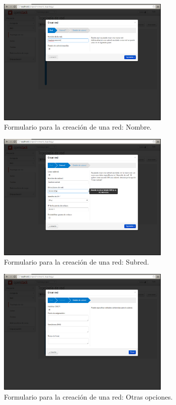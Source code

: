 \documentclass{article}
\begin{document}
\begin{figure}[h]
  \centering
    \includegraphics[width=0.75\textwidth]{img/m_018.png}
  \caption{Formulario para la creación de una red: Nombre.}
  \label{fig:CreateNetwork}
\end{figure}

\begin{figure}[h]
  \centering
    \includegraphics[width=0.75\textwidth]{img/m_019.png}
  \caption{Formulario para la creación de una red: Subred. }
  \label{fig:CreateNetworkSubnet}
\end{figure}

\begin{figure}[h]
  \centering
    \includegraphics[width=0.75\textwidth]{img/m_020.png}
  \caption{Formulario para la creación de una red: Otras opciones. }
  \label{fig:CreateNetworkDHCP}
\end{figure}
\end{document}
